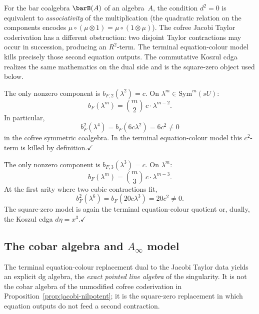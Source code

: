 \begin{remark}
\label{rem:jacobi-vs-bar}
For the bar coalgebra $\barB(A)$ of an algebra~$A$, the condition
$d^2 = 0$ is equivalent to \emph{associativity} of the multiplication
(the quadratic relation on the components encodes
$\mu \circ (\mu \otimes 1) = \mu \circ (1 \otimes \mu)$). The cofree
Jacobi Taylor coderivation has a different obstruction: two disjoint
Taylor contractions may occur in succession, producing an \(R^2\)-term.
The terminal equation-colour model kills precisely those second
equation outputs. The commutative Koszul cdga realizes the same
mathematics on the dual side and is the square-zero object used below.
\end{remark}

\begin{verification}[Node: the cofree square for $F(x)=x^2$]
\label{verif:jacobi-node-nilpotent}
The only nonzero component is
$b_{F,2}(\lambda^2) = c$. On $\lambda^m \in \mathrm{Sym}^m(sU)$:
\[
b_F(\lambda^m) = \binom{m}{2}\, c \cdot \lambda^{m-2}.
\]
In particular,
\[
b_F^2(\lambda^4)=b_F(6c\lambda^2)=6c^2\neq0
\]
in the cofree symmetric coalgebra. In the terminal equation-colour
model this \(c^2\)-term is killed by definition.\hfill$\checkmark$
\end{verification}

\begin{verification}[Cusp: the cofree square for $F(x)=x^3$]
\label{verif:jacobi-cusp-nilpotent}
The only nonzero component is $b_{F,3}(\lambda^3) = c$. On
$\lambda^m$:
\[
b_F(\lambda^m) = \binom{m}{3}\, c \cdot \lambda^{m-3}.
\]
At the first arity where two cubic contractions fit,
\[
b_F^2(\lambda^6)=b_F(20c\lambda^3)=20c^2\neq0.
\]
The square-zero model is again the terminal equation-colour quotient
or, dually, the Koszul cdga \(d\eta=x^3\).\hfill$\checkmark$
\end{verification}

\subsection{The cobar algebra and $A_\infty$ model}

The terminal equation-colour replacement dual to the Jacobi Taylor
data yields an explicit dg algebra, the \emph{exact pointed line
algebra} of the singularity. It is not the cobar algebra of the
unmodified cofree coderivation in
Proposition~\ref{prop:jacobi-nilpotent}; it is the square-zero
replacement in which equation outputs do not feed a second
contraction.

